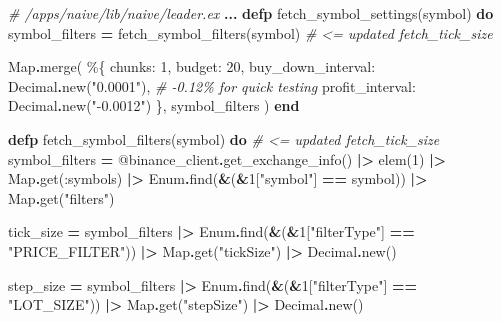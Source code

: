 \documentclass[
  oneside]{book}
\newenvironment{Shaded}{\begin{snugshade}}{\end{snugshade}}
\newcommand{\CommentTok}[1]{\textcolor[rgb]{0.56,0.35,0.01}{\textit{#1}}}
\newcommand{\ConstantTok}[1]{\textcolor[rgb]{0.00,0.00,0.00}{#1}}
\newcommand{\DecValTok}[1]{\textcolor[rgb]{0.00,0.00,0.81}{#1}}
\newcommand{\KeywordTok}[1]{\textcolor[rgb]{0.13,0.29,0.53}{\textbf{#1}}}
\newcommand{\NormalTok}[1]{#1}
\newcommand{\OperatorTok}[1]{\textcolor[rgb]{0.81,0.36,0.00}{\textbf{#1}}}
\newcommand{\OtherTok}[1]{\textcolor[rgb]{0.56,0.35,0.01}{#1}}
\newcommand{\StringTok}[1]{\textcolor[rgb]{0.31,0.60,0.02}{#1}}
\newcommand{\VariableTok}[1]{\textcolor[rgb]{0.00,0.00,0.00}{#1}}
\begin{document}
\begin{Shaded}
\begin{Highlighting}[]
  \CommentTok{\# /apps/naive/lib/naive/leader.ex}
  \OperatorTok{...}
  \KeywordTok{defp}\NormalTok{ fetch\_symbol\_settings(symbol) }\KeywordTok{do}
\NormalTok{    symbol\_filters }\OperatorTok{=}\NormalTok{ fetch\_symbol\_filters(symbol) }\CommentTok{\# \textless{}= updated fetch\_tick\_size}
    
    \ConstantTok{Map}\OperatorTok{.}\NormalTok{merge(}
\NormalTok{      \%\{}
        \VariableTok{chunks:} \DecValTok{1}\NormalTok{,}
        \VariableTok{budget:} \DecValTok{20}\NormalTok{,}
        \VariableTok{buy\_down\_interval:} \ConstantTok{Decimal}\OperatorTok{.}\NormalTok{new(}\StringTok{"0.0001"}\NormalTok{),}
        \CommentTok{\# {-}0.12\% for quick testing}
        \VariableTok{profit\_interval:} \ConstantTok{Decimal}\OperatorTok{.}\NormalTok{new(}\StringTok{"{-}0.0012"}\NormalTok{)}
\NormalTok{      \},}
\NormalTok{      symbol\_filters}
\NormalTok{    )}
  \KeywordTok{end}

  \KeywordTok{defp}\NormalTok{ fetch\_symbol\_filters(symbol) }\KeywordTok{do}  \CommentTok{\# \textless{}= updated fetch\_tick\_size}
\NormalTok{    symbol\_filters }\OperatorTok{=}
      \OtherTok{@binance\_client}\OperatorTok{.}\NormalTok{get\_exchange\_info()}
      \OperatorTok{|\textgreater{}}\NormalTok{ elem(}\DecValTok{1}\NormalTok{)}
      \OperatorTok{|\textgreater{}} \ConstantTok{Map}\OperatorTok{.}\NormalTok{get(}\VariableTok{:symbols}\NormalTok{)}
      \OperatorTok{|\textgreater{}} \ConstantTok{Enum}\OperatorTok{.}\NormalTok{find(}\OperatorTok{\&}\NormalTok{(}\OperatorTok{\&}\DecValTok{1}\NormalTok{[}\StringTok{"symbol"}\NormalTok{] }\OperatorTok{==}\NormalTok{ symbol))}
      \OperatorTok{|\textgreater{}} \ConstantTok{Map}\OperatorTok{.}\NormalTok{get(}\StringTok{"filters"}\NormalTok{)}

\NormalTok{    tick\_size }\OperatorTok{=}
\NormalTok{      symbol\_filters}
      \OperatorTok{|\textgreater{}} \ConstantTok{Enum}\OperatorTok{.}\NormalTok{find(}\OperatorTok{\&}\NormalTok{(}\OperatorTok{\&}\DecValTok{1}\NormalTok{[}\StringTok{"filterType"}\NormalTok{] }\OperatorTok{==} \StringTok{"PRICE\_FILTER"}\NormalTok{))}
      \OperatorTok{|\textgreater{}} \ConstantTok{Map}\OperatorTok{.}\NormalTok{get(}\StringTok{"tickSize"}\NormalTok{)}
      \OperatorTok{|\textgreater{}} \ConstantTok{Decimal}\OperatorTok{.}\NormalTok{new()}

\NormalTok{    step\_size }\OperatorTok{=}
\NormalTok{      symbol\_filters}
      \OperatorTok{|\textgreater{}} \ConstantTok{Enum}\OperatorTok{.}\NormalTok{find(}\OperatorTok{\&}\NormalTok{(}\OperatorTok{\&}\DecValTok{1}\NormalTok{[}\StringTok{"filterType"}\NormalTok{] }\OperatorTok{==} \StringTok{"LOT\_SIZE"}\NormalTok{))}
      \OperatorTok{|\textgreater{}} \ConstantTok{Map}\OperatorTok{.}\NormalTok{get(}\StringTok{"stepSize"}\NormalTok{)}
      \OperatorTok{|\textgreater{}} \ConstantTok{Decimal}\OperatorTok{.}\NormalTok{new()}


\end{Highlighting}
\end{Shaded}
\end{document}
